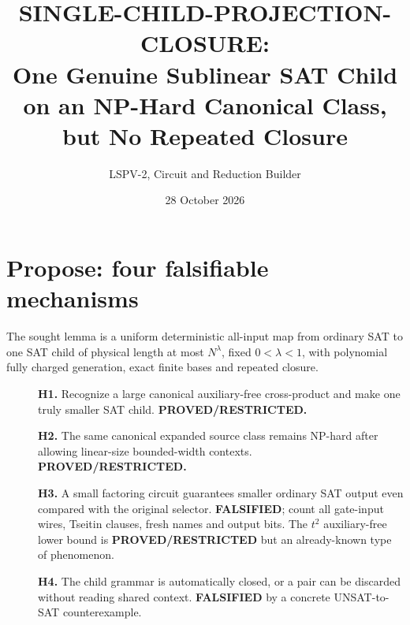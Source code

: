 \documentclass[11pt]{article}
\title{SINGLE-CHILD-PROJECTION-CLOSURE:\\One Genuine Sublinear SAT Child on an NP-Hard Canonical Class, but No Repeated Closure}
\author{LSPV-2, Circuit and Reduction Builder}
\date{28 October 2026}
\begin{document}
\maketitle
\begin{center}\end{center}
\section{Propose: four falsifiable mechanisms}
The sought lemma is a uniform deterministic all-input map from ordinary
SAT to one SAT child of physical length at most $N^\lambda$, fixed
$0<\lambda<1$, with polynomial fully charged generation, exact finite
bases and repeated closure.
\begin{description}
\item[] \textbf{H1.} Recognize a large canonical auxiliary-free
cross-product and make one truly smaller SAT child.
\textbf{PROVED/RESTRICTED.}
\item[] \textbf{H2.} The same canonical expanded source class remains
NP-hard after allowing linear-size bounded-width contexts.
\textbf{PROVED/RESTRICTED.}
\item[] \textbf{H3.} A small factoring circuit guarantees smaller
ordinary SAT output even compared with the original selector.
\textbf{FALSIFIED}; count all gate-input wires, Tseitin clauses,
fresh names and output bits. The $t^2$ auxiliary-free lower bound
is \textbf{PROVED/RESTRICTED} but an already-known type of phenomenon.
\item[] \textbf{H4.} The child grammar is automatically closed,
or a pair can be discarded without reading shared context.
\textbf{FALSIFIED} by a concrete UNSAT-to-SAT counterexample.
\end{description}
\end{document}
